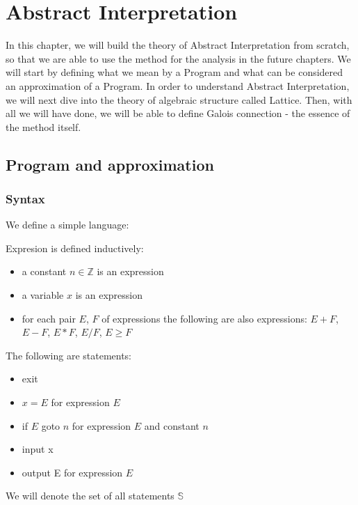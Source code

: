 \chapter{Abstract Interpretation}


In this chapter, we will build the theory of Abstract Interpretation from scratch, so that we are able to use the method
for the analysis in the future chapters.
We will start by defining what we mean by a Program and what can be considered an approximation of a Program.
In order to understand Abstract Interpretation, we will next dive into the theory of algebraic structure called Lattice.
Then, with all we will have done, we will be able to define Galois connection - the essence of the method itself.

\section{Program and approximation}

\subsection{Syntax}

We define a simple language: %

\begin{defn}[Expression]
    Expresion is defined inductively:
    \begin{itemize}
        \item a constant $n \in \mathbb{Z}$ is an expression
        \item a variable $x$ is an expression
        \item for each pair $E$, $F$ of expressions the following are also expressions: $E+F$, $E-F$, $E * F$, $E/F$, $E \geq F$
    \end{itemize}
\end{defn}

\begin{defn}[Statement] %
    The following are statements:
    \begin{itemize}
        \item exit
        \item $x = E$ for expression $E$ %
        \item if $E$ goto $n$ for expression $E$ and constant $n$
        \item input x
        \item output E for expression $E$
    \end{itemize}
    We will denote the set of all statements $\mathbb{S}$
\end{defn}

